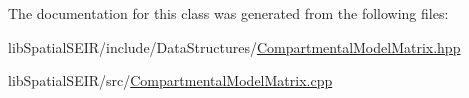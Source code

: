 The documentation for this class was generated from the following files\-:\begin{DoxyCompactItemize}
\item 
lib\-Spatial\-S\-E\-I\-R/include/\-Data\-Structures/\hyperlink{CompartmentalModelMatrix_8hpp}{Compartmental\-Model\-Matrix.\-hpp}\item 
lib\-Spatial\-S\-E\-I\-R/src/\hyperlink{CompartmentalModelMatrix_8cpp}{Compartmental\-Model\-Matrix.\-cpp}\end{DoxyCompactItemize}
